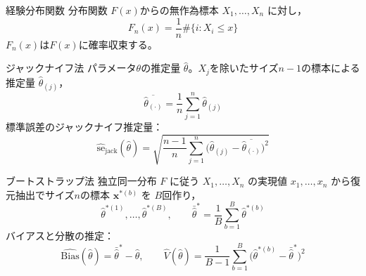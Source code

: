 \documentclass[a4paper,11pt]{ltjsarticle}
\begin{document}
\begin{term}{経験分布関数}
分布関数 $F(x)$からの無作為標本 $X_1,\dots,X_n$ に対し，
\[
F_n(x) = \frac{1}{n}\#\{i : X_i\le x\}
\]
$F_n(x)$は$F(x)$に確率収束する。
\end{term}

\begin{term}{ジャックナイフ法}
パラメータ$\theta$の推定量 $\hat\theta$。$X_j$を除いたサイズ$n-1$の標本による推定量 $\hat\theta_{(j)}$，
\[
\overline{\hat\theta_{(\cdot)}} = \frac1n\sum_{j=1}^n \hat\theta_{(j)}
\]
標準誤差のジャックナイフ推定量：
\[
\widehat{\mathrm{se}}_{\mathrm{jack}}(\hat\theta) = \sqrt{\frac{n-1}{n}\sum_{j=1}^n\big(\hat\theta_{(j)}-\overline{\hat\theta_{(\cdot)}}\big)^2}
\]
\end{term}

\begin{term}{ブートストラップ法}
独立同一分布 $F$ に従う $X_1,\dots,X_n$ の実現値 $x_1,\dots,x_n$ から復元抽出でサイズ$n$の標本 $\bm x^{*(b)}$ を $B$回作り，
\[
\hat\theta^{*(1)},\dots,\hat\theta^{*(B)}, \qquad
\bar{\hat\theta}^{*} = \frac1B\sum_{b=1}^B \hat\theta^{*(b)}
\]
バイアスと分散の推定：
\[
\widehat{\mathrm{Bias}}(\hat\theta) = \bar{\hat\theta}^{*}-\hat\theta, \qquad
\widehat{V}(\hat\theta) = \frac{1}{B-1}\sum_{b=1}^B\big(\hat\theta^{*(b)}-\bar{\hat\theta}^{*}\big)^2
\]
\end{term}
\end{document}
